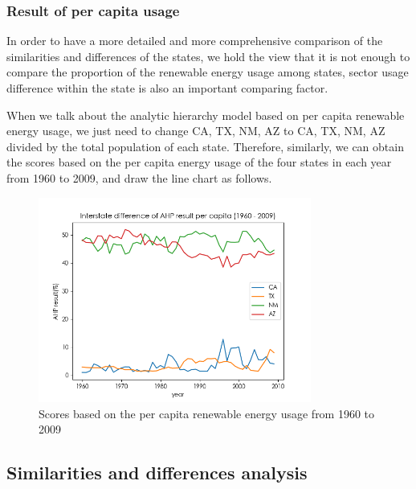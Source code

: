 \documentclass[a4paper,11pt]{article}
\begin{document}
\subsubsection{Result of per capita usage}
\par In order to have a more detailed and more comprehensive comparison of the similarities and differences of the states, we hold the view that it is not enough to compare the proportion of the renewable energy usage among states, sector usage difference within the state is also an important comparing factor.
\par When we talk about the analytic hierarchy model based on per capita renewable energy usage, we just need to change CA, TX, NM, AZ to CA, TX, NM, AZ divided by the total population of each state. Therefore, similarly, we can obtain the scores based on the per capita energy usage of the four states in each year from 1960 to 2009, and draw the line chart as follows.
\begin{figure}[H] 
    \centering 
    \includegraphics[width=0.8\textwidth]{./Pic/B-level-percapita.png}
    \caption{Scores based on the per capita renewable energy usage from 1960 to 2009}
    \label{fig:B-level-percapita}
\end{figure}

\subsection{Similarities and differences analysis}
\end{document}
